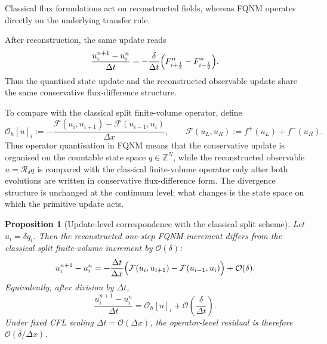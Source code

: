 \documentclass[sn-basic]{sn-jnl}
\theoremstyle{plain}
\newtheorem{proposition}[theorem]{Proposition}
\theoremstyle{remark}
\begin{document}
Classical flux formulations act on reconstructed fields, whereas FQNM operates directly on the underlying transfer rule.

After reconstruction, the same update reads
 \begin{equation}
 \frac{u_i^{n+1}-u_i^n}{\Delta t}
 = -\frac{\delta}{\Delta t}\Bigl(F_{i+\frac12}^n-F_{i-\frac12}^n\Bigr).
 \label{eq:reconstructed_flux_difference_form}
 \end{equation}
Thus the quantised state update and the reconstructed observable update share the same conservative flux-difference structure.


To compare with the classical split finite-volume operator, define
\begin{equation}
\mathcal O_h[u]_i := -\frac{\mathcal F(u_i,u_{i+1})-\mathcal F(u_{i-1},u_i)}{\Delta x},
\qquad
\mathcal F(u_L,u_R):=f^+(u_L)+f^-(u_R).
\label{eq:classical_operator_definition}
\end{equation}
Thus operator quantisation in FQNM means that the conservative update is organised on the countable state space $q\in\mathbb Z^N$, while the reconstructed observable $u=\mathcal R_\delta q$ is compared with the classical finite-volume operator only after both evolutions are written in conservative flux-difference form. The divergence structure is unchanged at the continuum level; what changes is the state space on which the primitive update acts.

 \begin{proposition}[Update-level correspondence with the classical split scheme]
\label{prop:operator_quantisation_error}
Let $u_i=\delta q_i$. Then the reconstructed one-step FQNM increment differs from the classical split finite-volume increment by $\mathcal O(\delta)$:
\begin{equation}
u_i^{n+1}-u_i^n
= -\frac{\Delta t}{\Delta x}\Bigl(\mathcal F(u_i,u_{i+1})-\mathcal F(u_{i-1},u_i)\Bigr)
+ \mathcal O(\delta).
\label{eq:operator_quantisation_error_bound}
\end{equation}
Equivalently, after division by $\Delta t$,
\begin{equation}
\frac{u_i^{n+1}-u_i^n}{\Delta t}
= \mathcal O_h[u]_i + \mathcal O\!\left(\frac{\delta}{\Delta t}\right).
\label{eq:operator_quantisation_error_asymptotic}
\end{equation}
Under fixed CFL scaling $\Delta t=\mathcal O(\Delta x)$, the operator-level residual is therefore $\mathcal O(\delta/\Delta x)$.
\end{proposition}
\end{document}
